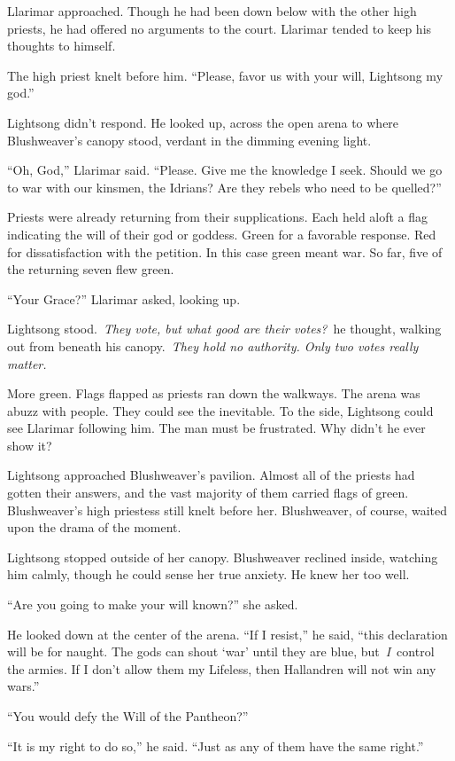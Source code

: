 Llarimar approached. Though he had been down below with the other high priests, he had offered no arguments to the court. Llarimar tended to keep his thoughts to himself.

The high priest knelt before him. “Please, favor us with your will, Lightsong my god.”

Lightsong didn’t respond. He looked up, across the open arena to where Blushweaver’s canopy stood, verdant in the dimming evening light.

“Oh, God,” Llarimar said. “Please. Give me the knowledge I seek. Should we go to war with our kinsmen, the Idrians? Are they rebels who need to be quelled?”

Priests were already returning from their supplications. Each held aloft a flag indicating the will of their god or goddess. Green for a favorable response. Red for dissatisfaction with the petition. In this case green meant war. So far, five of the returning seven flew green.

“Your Grace?” Llarimar asked, looking up.

Lightsong stood.~\textit{They vote, but what good are their votes?}~he thought, walking out from beneath his canopy.~\textit{They hold no authority. Only two votes really matter.}

More green. Flags flapped as priests ran down the walkways. The arena was abuzz with people. They could see the inevitable. To the side, Lightsong could see Llarimar following him. The man must be frustrated. Why didn’t he ever show it?

Lightsong approached Blushweaver’s pavilion. Almost all of the priests had gotten their answers, and the vast majority of them carried flags of green. Blushweaver’s high priestess still knelt before her. Blushweaver, of course, waited upon the drama of the moment.

Lightsong stopped outside of her canopy. Blushweaver reclined inside, watching him calmly, though he could sense her true anxiety. He knew her too well.

“Are you going to make your will known?” she asked.

He looked down at the center of the arena. “If I resist,” he said, “this declaration will be for naught. The gods can shout ‘war’ until they are blue, but~\textit{I}~control the armies. If I don’t allow them my Lifeless, then Hallandren will not win any wars.”

“You would defy the Will of the Pantheon?”

“It is my right to do so,” he said. “Just as any of them have the same right.”

